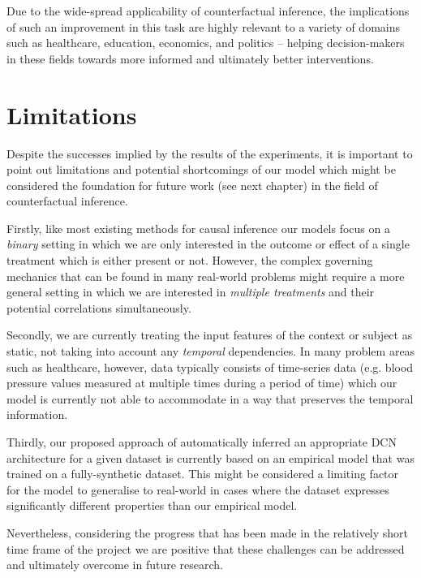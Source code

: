 Due to the wide-spread applicability of counterfactual inference, the implications of such an  improvement in this task are highly relevant to a variety of domains such as healthcare, education, economics, and politics -- helping decision-makers in these fields towards more informed and ultimately better interventions. 

\section{Limitations}
Despite the successes implied by the results of the experiments, it is important to point out limitations and potential shortcomings of our model which might be considered the foundation for future work (see next chapter) in the field of counterfactual inference. 

Firstly, like most existing methods for causal inference our models focus on a \emph{binary} setting in which we are only interested in the outcome or effect of a single treatment which is either present or not. However, the complex governing mechanics that can be found in many real-world problems might require a more general setting in which we are interested in \emph{multiple treatments} and their potential correlations simultaneously.

Secondly, we are currently treating the input features of the context or subject as static, not taking into account any \emph{temporal} dependencies. In many problem areas such as healthcare, however, data typically consists of time-series data (e.g. blood pressure values measured at multiple times during a period of time) which our model is currently not able to accommodate in a way that preserves the temporal information. 

Thirdly, our proposed approach of automatically inferred an appropriate DCN architecture for a given dataset is currently based on an empirical model that was trained on a fully-synthetic dataset. This might be considered a limiting factor for the model to generalise to real-world in cases where the dataset expresses significantly different properties than our empirical model.  

Nevertheless, considering the progress that has been made in the relatively short time frame of the project we are positive that these challenges can be addressed and ultimately overcome in future research.


%


